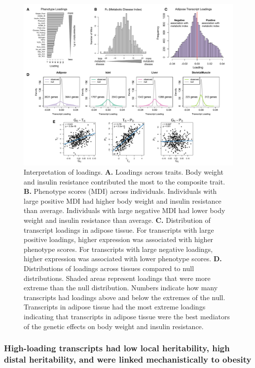 \documentclass[
]{article}
\begin{document}
\begin{figure}[ht!]
\includegraphics[width=\textwidth]{Figures/Fig4_interpretation.pdf} 
\caption{Interpretation of loadings. \textbf{A.} Loadings across traits. 
Body weight and insulin resistance contributed the most to the composite 
trait. \textbf{B.} Phenotype scores (MDI) across individuals. Individuals with 
large positive MDI had higher body weight and insulin 
resistance than average. Individuals with large negative MDI had 
lower body weight and insulin resistance than average. 
\textbf{C.} Distribution of transcript loadings in adipose tissue. 
For transcripts with large positive loadings, higher expression was 
associated with higher phenotype scores. For transcripts with large 
negative loadings, higher expression was associated with lower phenotype 
scores. \textbf{D.} Distributions of loadings across tissues compared 
to null distributions. Shaded areas represent loadings that were more 
extreme than the null distribution. Numbers indicate how many transcripts 
had loadings above and below the extremes of the null. Transcripts in 
adipose tissue had the most extreme loadings indicating that transcripts 
in adipose tissue were the best mediators of the genetic effects on body 
weight and insulin resistance.
}
\label{fig:interpretation}
\end{figure}

\pagebreak

\subsubsection{High-loading transcripts had low local heritability, high
distal heritability, and were linked mechanistically to
obesity}\label{high-loading-transcripts-had-low-local-heritability-high-distal-heritability-and-were-linked-mechanistically-to-obesity}
\end{document}
